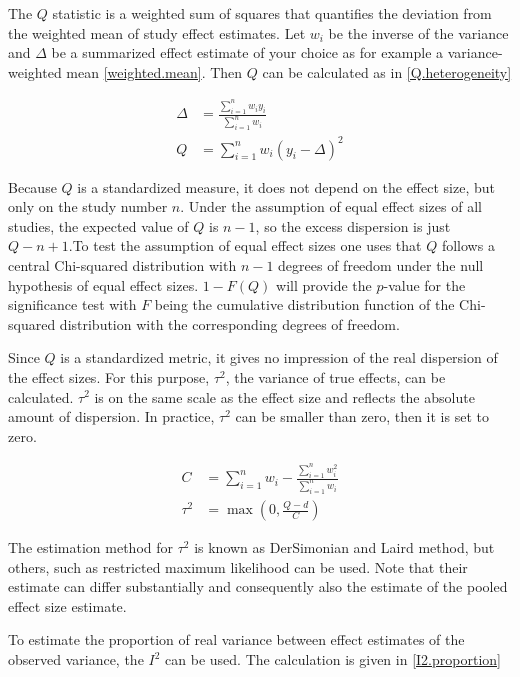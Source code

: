 \documentclass[11pt,a4paper,twoside]{book}\usepackage[]{graphicx}\usepackage[]{color}
\begin{document}
\vspace{0mm}
The $Q$ statistic is a weighted sum of squares that quantifies the deviation from the weighted mean of study effect estimates. Let $w_i$ be the inverse of the variance and $\Delta$ be a summarized effect estimate of your choice as for example a variance-weighted mean \ref{weighted.mean}. Then $Q$ can be calculated as in \ref{Q.heterogeneity}

\begin{align}
\Delta &= \frac{\sum_{i = 1}^n w_{i}y_{i}}{\sum_{i = 1}^n w_{i}} \label{weighted.mean} \\
Q &= \sum_{i = 1}^n w_{i}(y_{i} - \Delta)^2 \label{Q.heterogeneity}
\end{align}

Because $Q$ is a standardized measure, it does not depend on the effect size, but only on the study number $n$. Under the assumption of equal effect sizes of all studies, the expected value of $Q$ is $n-1$, so the excess dispersion is just $Q - n + 1$.To test the assumption of equal effect sizes one uses that $Q$ follows a central Chi-squared distribution with $n -1$ degrees of freedom under the null hypothesis of equal effect sizes. $1 - F(Q)$ will provide the $p$-value for the significance test with $F$ being the cumulative distribution function of the Chi-squared distribution with the corresponding degrees of freedom.

\vspace{0mm}
Since $Q$ is a standardized metric, it gives no impression of the real dispersion of the effect sizes. For this purpose, $\tau^2$, the variance of true effects, can be calculated. $\tau^2$ is on the same scale as the effect size and reflects the absolute amount of dispersion. In practice, $\tau^2$ can be smaller than zero, then it is set to zero.

\begin{align}
C &= \sum_{i = 1}^n w_{i} - \frac{\sum_{i = 1}^n w_{i}^2}{\sum_{i = 1}^n w_{i}} \label{C.definition} \\
\tau^2 &= \max(0, \frac{Q - d}{C}) \label{Tau.definition}
\end{align}

The estimation method for $\tau^2$ is known as DerSimonian and Laird method, but others, such as restricted maximum likelihood can be used. Note that their estimate can differ substantially and consequently also the estimate of the pooled effect size estimate.

\vspace{0mm}
To estimate the proportion of real variance between effect estimates of the observed variance, the $I^2$ can be used. The calculation is given in \ref{I2.proportion}
\end{document}
